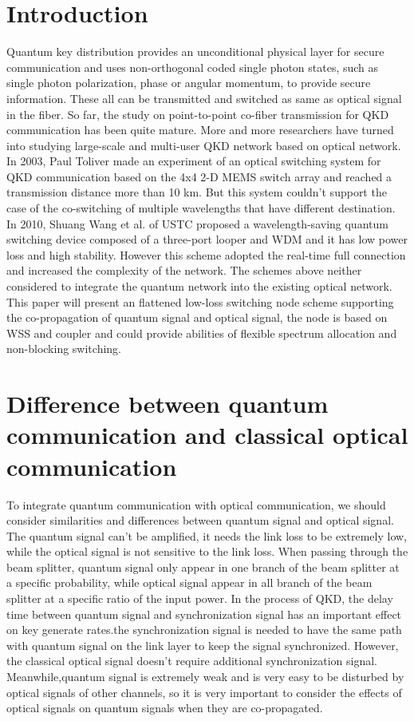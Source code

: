 \documentclass[letterpaper,10pt]{article}
\begin{document}
\section{Introduction}
Quantum key distribution provides an unconditional physical layer for secure communication\cite{ToliverPaul} and uses non-orthogonal coded single photon states, such as single photon polarization, phase or angular momentum, to provide secure information. These all can be transmitted and switched as same as optical signal in the fiber. So far, the study on point-to-point co-fiber transmission for QKD communication has been quite mature. More and more researchers have turned into studying large-scale and multi-user QKD network based on optical network. In 2003, Paul Toliver made an experiment of an optical switching system for QKD communication based on the 4x4 2-D MEMS switch array and reached a transmission distance more than 10 km\cite{ToliverPaul}. But this system couldn't support the case of the co-switching of multiple wavelengths that have different destination. In 2010, Shuang Wang et al. of USTC proposed a wavelength-saving quantum switching device composed of a three-port looper and WDM\cite{WangShuang} and it has low power loss and high stability.  However this scheme adopted the real-time full connection and increased the complexity of the network. The schemes above neither considered to integrate the quantum network into the existing optical network. This paper will present an flattened low-loss switching node scheme supporting the co-propagation of quantum signal and optical signal, the node is based on WSS and coupler and could provide abilities of flexible spectrum allocation and non-blocking switching.

\section{Difference between quantum communication and classical optical communication}
To integrate quantum communication with optical communication, we should consider similarities and differences between quantum signal and optical signal. The quantum signal can't be amplified, it needs the link loss to be extremely low, while the optical signal is not sensitive to the link loss. When passing through the beam splitter, quantum signal only appear in one branch of the beam splitter at a specific probability, while optical signal appear in all branch of the beam splitter at a specific ratio of the input power. In the process of QKD, the delay time between quantum signal and synchronization signal has an important effect on key generate rates.the synchronization signal is needed to have the same path with quantum signal on the link layer to keep the signal synchronized. However, the classical optical signal doesn't require additional synchronization signal. Meanwhile,quantum signal is extremely weak and is very easy to be disturbed by optical signals of other channels, so it is very important to consider the effects of optical signals on quantum signals when they are co-propagated. 
\end{document}
